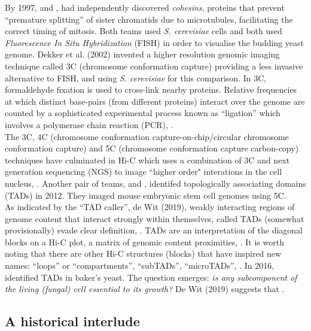 By 1997, \cite{guacci1997direct} and \cite{michaelis1997cohesins},
had independently discovered \textit{cohesins}, proteins that 
prevent ``premature splitting'' of sister chromatids due 
to microtubules, facilitating the correct timing of mitosis. 
Both teams used \textit{S. cerevisiae} cells and both
used \textit{Fluorescence In Situ Hybridization} (FISH) in order to visualise 
the budding yeast genome. Dekker et al. (2002) invented a higher 
resolution genomic imaging technique called 3C (chromosome conformation capture)
\cite{dekker2002capturing} providing a less invasive alternative 
to FISH, and using \textit{S. cerevisiae} for this comparison.
In 3C, formaldehyde fixation is used to cross-link nearby proteins.
Relative frequencies at which distinct base-pairs (from different proteins)
interact over the genome are counted by a sophisticated experimental
process known as ``ligation'' which involves a polymerase chain reaction (PCR),
\cite{dekker2002capturing}.
\\

The 3C, 4C (chromosome conformation capture-on-chip/circular chromosome conformation capture) and 5C 
(chromosome conformation capture carbon-copy) techniques have culminated in Hi-C which 
uses a combination of 3C and next generation sequencing (NGS) to image ``higher order" interations 
in the cell nucleus, \cite{nora2012spatial}. Another pair of teams, \cite{nora2012spatial} and 
\cite{dixon2012topological}, identifed topologically associating domains (TADs) in 2012. 
They imaged mouse embryonic stem cell genomes using 5C.
\\

As indicated by the ``TAD caller'', de Wit (2019), 
weakly interacting regions of genome content that interact strongly within themselves,
called TADs (somewhat provisionally) evade clear definition, \cite{de2020tads}.
TADs are an interpretation of the diagonal blocks on a Hi-C plot, a matrix of genomic 
content proximities, \cite{de2020tads}. It is worth noting that there are 
other Hi-C structures (blocks) that have inspired new names: ``loops'' or ``compartments'', ``subTADs'',
``microTADs'', \cite{beagan2020existence}. In 2016, \cite{eser2017form} identified TADs 
in baker's yeast. The question emerges: \textit{is any subcomponent of the living (fungal) cell essential to its
growth? } De Wit (2019) suggests that .

\subsection{A historical interlude}

